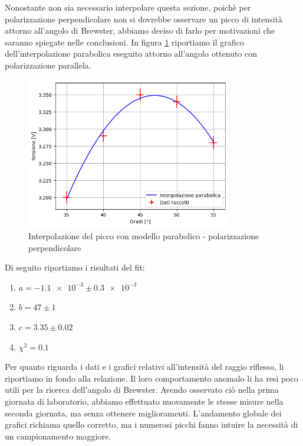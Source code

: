\documentclass[letterpaper,12pt]{article}
\begin{document}
Nonostante non sia necessario interpolare questa sezione, poichè per polarizzazione perpendicolare non si dovrebbe 
osservare un picco di intensità attorno all'angolo di Brewster, abbiamo deciso di farlo per motivazioni che
saranno spiegate nelle conclusioni. In figura \ref{fig:wrong_pol_fit} riportiamo il grafico dell'interpolazione 
parabolica eseguito attorno all'angolo ottenuto con polarizzazione parallela.

\begin{figure}[h]
	\centering
	\includegraphics[width = 0.8\textwidth]{wrong_pol_fit.png}
	\caption{Interpolazione del picco con modello parabolico - polarizzazione perpendicolare}
	\label{fig:wrong_pol_fit}
\end{figure}

Di seguito riportiamo i risultati del fit:
\begin{enumerate}
	\item $a = \num{-1.1e-3}  \pm \num{0.3e-3}$
	\item $b = 47 \pm 1$
	\item $c = 3.35 \pm 0.02$
	\item $\chi^2 = 0.1$
\end{enumerate}

\newpage

Per quanto riguarda i dati e i grafici relativi all'intensità del raggio riflesso, li riportiamo in fondo alla 
relazione. Il loro comportamento anomalo li ha resi poco utili per la ricerca dell'angolo di Brewster.
Avendo osservato ciò nella prima giornata di laboratorio, abbiamo effettuato nuovamente le stesse misure 
nella seconda giornata, ma senza ottenere miglioramenti. L'andamento globale dei grafici richiama quello corretto,
ma i numerosi picchi fanno intuire la necessità di un campionamento maggiore.\\
\end{document}

